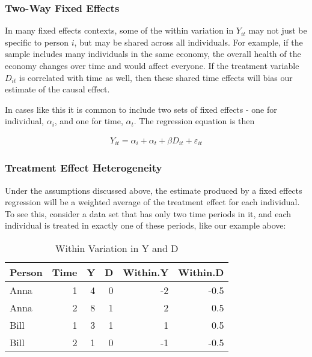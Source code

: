 \documentclass[]{book}
\theoremstyle{definition}
\theoremstyle{definition}
\theoremstyle{definition}
\theoremstyle{remark}
\begin{document}
\subsubsection{Two-Way Fixed Effects}\label{two-way-fixed-effects}

In many fixed effects contexts, some of the within variation in
\(Y_{it}\) may not just be specific to person \(i\), but may be shared
across all individuals. For example, if the sample includes many
individuals in the same economy, the overall health of the economy
changes over time and would affect everyone. If the treatment variable
\(D_{it}\) is correlated with time as well, then these shared time
effects will bias our estimate of the causal effect.

In cases like this it is common to include two sets of fixed effects -
one for individual, \(\alpha_i\), and one for time, \(\alpha_t\). The
regression equation is then

\begin{align}
  Y_{it} = \alpha_{i} + \alpha_{t} + \beta D_{it} + \varepsilon_{it} \label{eq:fe4}
\end{align}

\subsubsection{Treatment Effect
Heterogeneity}\label{treatment-effect-heterogeneity}

Under the assumptions discussed above, the estimate produced by a fixed
effects regression will be a weighted average of the treatment effect
for each individual. To see this, consider a data set that has only two
time periods in it, and each individual is treated in exactly one of
these periods, like our example above:

\begin{table}[t]

\caption{\label{tab:unnamed-chunk-14}Within Variation in Y and D}
\centering
\begin{tabular}{l|r|r|r|r|r}
\hline
Person & Time & Y & D & Within.Y & Within.D\\
\hline
Anna & 1 & 4 & 0 & -2 & -0.5\\
\hline
Anna & 2 & 8 & 1 & 2 & 0.5\\
\hline
Bill & 1 & 3 & 1 & 1 & 0.5\\
\hline
Bill & 2 & 1 & 0 & -1 & -0.5\\
\hline
\end{tabular}
\end{table}
\end{document}
